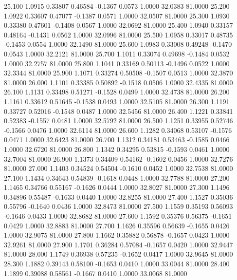  25.100   1.0915   0.33807   0.46584  -0.1367   0.0573   1.0000  32.0383  81.0000
  25.200   1.0922   0.33607   0.47077  -0.1387   0.0571   1.0000  32.0507  81.0000
  25.300   1.0930   0.33380   0.47601  -0.1408   0.0567   1.0000  32.0692  81.0000
  25.400   1.0940   0.33157   0.48164  -0.1431   0.0562   1.0000  32.0996  81.0000
  25.500   1.0958   0.33017   0.48735  -0.1453   0.0554   1.0000  32.1490  81.0000
  25.600   1.0983   0.33008   0.49248  -0.1470   0.0543   1.0000  32.2121  81.0000
  25.700   1.1011   0.33074   0.49698  -0.1484   0.0532   1.0000  32.2757  81.0000
  25.800   1.1041   0.33169   0.50113  -0.1496   0.0522   1.0000  32.3344  81.0000
  25.900   1.1071   0.33274   0.50508  -0.1507   0.0513   1.0000  32.3870  81.0000
  26.000   1.1101   0.33385   0.50892  -0.1518   0.0506   1.0000  32.4335  81.0000
  26.100   1.1131   0.33498   0.51271  -0.1528   0.0499   1.0000  32.4738  81.0000
  26.200   1.1161   0.33612   0.51645  -0.1538   0.0493   1.0000  32.5105  81.0000
  26.300   1.1191   0.33727   0.52016  -0.1548   0.0487   1.0000  32.5456  81.0000
  26.400   1.1221   0.33841   0.52383  -0.1557   0.0481   1.0000  32.5792  81.0000
  26.500   1.1251   0.33955   0.52746  -0.1566   0.0476   1.0000  32.6114  81.0000
  26.600   1.1282   0.34068   0.53107  -0.1576   0.0471   1.0000  32.6423  81.0000
  26.700   1.1312   0.34181   0.53463  -0.1585   0.0466   1.0000  32.6720  81.0000
  26.800   1.1342   0.34295   0.53815  -0.1593   0.0461   1.0000  32.7004  81.0000
  26.900   1.1373   0.34409   0.54162  -0.1602   0.0456   1.0000  32.7276  81.0000
  27.000   1.1403   0.34524   0.54504  -0.1610   0.0452   1.0000  32.7538  81.0000
  27.100   1.1434   0.34643   0.54839  -0.1618   0.0448   1.0000  32.7788  81.0000
  27.200   1.1465   0.34766   0.55167  -0.1626   0.0444   1.0000  32.8027  81.0000
  27.300   1.1496   0.34896   0.55487  -0.1633   0.0440   1.0000  32.8255  81.0000
  27.400   1.1527   0.35036   0.55796  -0.1640   0.0436   1.0000  32.8473  81.0000
  27.500   1.1559   0.35193   0.56093  -0.1646   0.0433   1.0000  32.8682  81.0000
  27.600   1.1592   0.35376   0.56375  -0.1651   0.0429   1.0000  32.8883  81.0000
  27.700   1.1626   0.35596   0.56639  -0.1655   0.0426   1.0000  32.9075  81.0000
  27.800   1.1662   0.35882   0.56878  -0.1657   0.0423   1.0000  32.9261  81.0000
  27.900   1.1701   0.36284   0.57084  -0.1657   0.0420   1.0000  32.9447  81.0000
  28.000   1.1749   0.36938   0.57235  -0.1652   0.0417   1.0000  32.9645  81.0000
  28.300   1.1882   0.39143   0.58100  -0.1653   0.0410   1.0000  33.0044  81.0000
  28.400   1.1899   0.39088   0.58561  -0.1667   0.0410   1.0000  33.0068  81.0000
